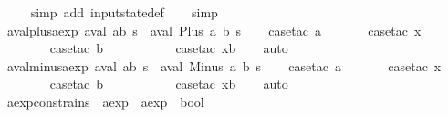 \begin{isabellebody}
\ \ \ \isamarkupfalse%
\ {\isacharparenleft}simp\ add{\isacharcolon}\ input{}state{\isacharunderscore}def{\isacharparenright}\isanewline
\ \ \isamarkupfalse%
\ simp%
\endisatagproof
{\isafoldproof}%
%
\isadelimproof
\isanewline
%
\endisadelimproof
\isanewline
{}\isamarkupfalse%
\ aval{\isacharunderscore}plus{\isacharunderscore}aexp{\isacharcolon}\ {\isachardoublequoteopen}aval\ {\isacharparenleft}a{\isacharplus}b{\isacharparenright}\ s\ {\isacharequal}\ aval\ {\isacharparenleft}Plus\ a\ b{\isacharparenright}\ s{\isachardoublequoteclose}\isanewline
%
\isadelimproof
\ \ %
\endisadelimproof
%
\isatagproof
{}\isamarkupfalse%
\ {\isacharparenleft}case{\isacharunderscore}tac\ a{\isacharparenright}\isanewline
\ \ \ \ \ \isamarkupfalse%
\ {\isacharparenleft}case{\isacharunderscore}tac\ x{}{\isacharparenright}\isanewline
\ \ \ \ \ \ \isamarkupfalse%
\ {\isacharparenleft}case{\isacharunderscore}tac\ b{\isacharparenright}\isanewline
\ \ \ \ \ \ \ \ \ \isamarkupfalse%
\ {\isacharparenleft}case{\isacharunderscore}tac\ x{}b{\isacharparenright}\isanewline
\ \ \isamarkupfalse%
\ auto%
\endisatagproof
{\isafoldproof}%
%
\isadelimproof
\isanewline
%
\endisadelimproof
\isanewline
{}\isamarkupfalse%
\ aval{\isacharunderscore}minus{\isacharunderscore}aexp{\isacharcolon}\ {\isachardoublequoteopen}aval\ {\isacharparenleft}a{\isacharminus}b{\isacharparenright}\ s\ {\isacharequal}\ aval\ {\isacharparenleft}Minus\ a\ b{\isacharparenright}\ s{\isachardoublequoteclose}\isanewline
%
\isadelimproof
\ \ %
\endisadelimproof
%
\isatagproof
{}\isamarkupfalse%
\ {\isacharparenleft}case{\isacharunderscore}tac\ a{\isacharparenright}\isanewline
\ \ \ \ \ \isamarkupfalse%
\ {\isacharparenleft}case{\isacharunderscore}tac\ x{}{\isacharparenright}\isanewline
\ \ \ \ \ \ \isamarkupfalse%
\ {\isacharparenleft}case{\isacharunderscore}tac\ b{\isacharparenright}\isanewline
\ \ \ \ \ \ \ \ \ \isamarkupfalse%
\ {\isacharparenleft}case{\isacharunderscore}tac\ x{}b{\isacharparenright}\isanewline
\ \ \isamarkupfalse%
\ auto%
\endisatagproof
{\isafoldproof}%
%
\isadelimproof
\isanewline
%
\endisadelimproof
\isanewline
{}\isamarkupfalse%
\ aexp{\isacharunderscore}constrains\ {\isacharcolon}{\isacharcolon}\ {\isachardoublequoteopen}aexp\ {\isasymRightarrow}\ aexp\ {\isasymRightarrow}\ bool{\isachardoublequoteclose}\ \isanewline

\end{isabellebody}

